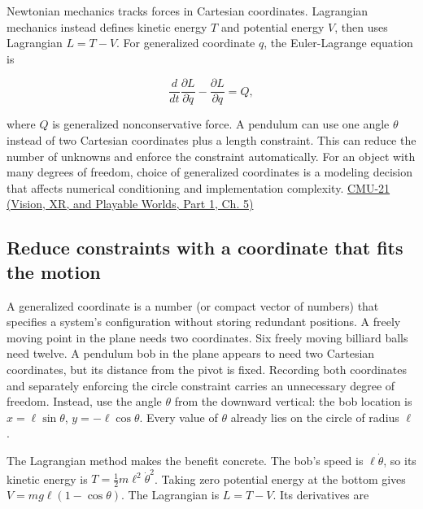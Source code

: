 \hypertarget{04-visual-computing-ii-ch029-lagrangian-mechanics-and-generalized-coordinates}{}

Newtonian mechanics tracks forces in Cartesian coordinates. Lagrangian mechanics instead defines kinetic energy \(T\) and potential energy \(V\), then uses Lagrangian \(L=T-V\). For generalized coordinate \(q\), the Euler-Lagrange equation is

\[
\frac{d}{dt}\frac{\partial L}{\partial\dot q}-\frac{\partial L}{\partial q}=Q,
\]

where \(Q\) is generalized nonconservative force. A pendulum can use one angle \(\theta\) instead of two Cartesian coordinates plus a length constraint. This can reduce the number of unknowns and enforce the constraint automatically. For an object with many degrees of freedom, choice of generalized coordinates is a modeling decision that affects numerical conditioning and implementation complexity. \href{../07-Vision-XR-and-Playable-Worlds-P01/main.pdf\#nameddest=04-visual-computing-ii-ch036-cmu-21---dynamics-and-time-integration}{CMU-21 (Vision, XR, and Playable Worlds, Part 1, Ch. 5)}

\subsection{Reduce constraints with a coordinate that fits the motion}\label{04-visual-computing-ii-ch029-reduce-constraints-with-a-coordinate-that-fits-the-motion}

\hypertarget{04-visual-computing-ii-ch029-reduce-constraints-with-a-coordinate-that-fits-the-motion}{}

A generalized coordinate is a number (or compact vector of numbers) that specifies a system's configuration without storing redundant positions. A freely moving point in the plane needs two coordinates. Six freely moving billiard balls need twelve. A pendulum bob in the plane appears to need two Cartesian coordinates, but its distance from the pivot is fixed. Recording both coordinates and separately enforcing the circle constraint carries an unnecessary degree of freedom. Instead, use the angle \(\theta\) from the downward vertical: the bob location is \(x=\ell\sin\theta\), \(y=-\ell\cos\theta\). Every value of \(\theta\) already lies on the circle of radius \(\ell\).

The Lagrangian method makes the benefit concrete. The bob's speed is \(\ell\dot\theta\), so its kinetic energy is \(T=\tfrac12m\ell^2\dot\theta^2\). Taking zero potential energy at the bottom gives \(V=mg\ell(1-\cos\theta)\). The Lagrangian is \(L=T-V\). Its derivatives are

